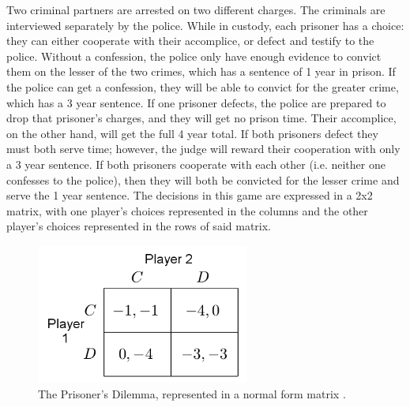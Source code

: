 \begin{exmp}
  Two criminal partners are arrested on two different charges. The criminals are interviewed separately by the police. While in custody, each prisoner has a choice: they can either cooperate with their accomplice, or defect and testify to the police. Without a confession, the police only have enough evidence to convict them on the lesser of the two crimes, which has a sentence of 1 year in prison. If the police can get a confession, they will be able to convict for the greater crime, which has a 3 year sentence. If one prisoner defects, the police are prepared to drop that prisoner's charges, and they will get no prison time. Their accomplice, on the other hand, will get the full 4 year total. If both prisoners defect they must both serve time; however, the judge will reward their cooperation with only a 3 year sentence. If both prisoners cooperate with each other (i.e. neither one confesses to the police), then they will both be convicted for the lesser crime and serve the 1 year sentence. The decisions in this game are expressed in a 2x2 matrix, with one player's choices represented in the columns and the other player's choices represented in the rows of said matrix.

\begin{figure}[H]
  \centering
  \includegraphics[width=7cm]{figures/ExampleGrid.png}
  \caption{The Prisoner's Dilemma, represented in a normal form matrix \cite{shoh09}.}
  \label{fig:prisoner}
\end{figure}
\end{exmp}

